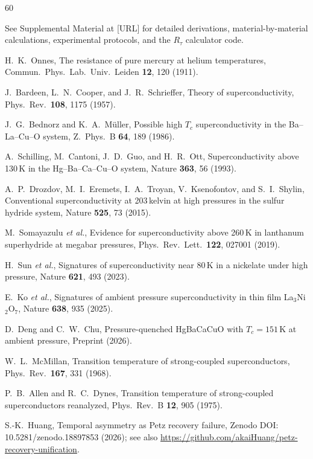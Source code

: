 \documentclass[prb,twocolumn,superscriptaddress,longbibliography,floatfix]{revtex4-2}
\newcommand{\tauasym}{\tau}
\newcommand{\Rtau}{R_{\tauasym}}
\begin{document}
\begin{thebibliography}{60}

See Supplemental Material at [URL] for detailed derivations,
material-by-material calculations, experimental protocols,
and the $\Rtau$ calculator code.

H.~K.~Onnes,
The resistance of pure mercury at helium temperatures,
Commun.\ Phys.\ Lab.\ Univ.\ Leiden \textbf{12}, 120 (1911).

J.~Bardeen, L.~N.~Cooper, and J.~R.~Schrieffer,
Theory of superconductivity,
Phys.\ Rev.\ \textbf{108}, 1175 (1957).

J.~G.~Bednorz and K.~A.~M\"uller,
Possible high $T_c$ superconductivity in the Ba--La--Cu--O system,
Z.\ Phys.\ B \textbf{64}, 189 (1986).

A.~Schilling, M.~Cantoni, J.~D.~Guo, and H.~R.~Ott,
Superconductivity above 130\,K in the Hg--Ba--Ca--Cu--O system,
Nature \textbf{363}, 56 (1993).

A.~P.~Drozdov, M.~I.~Eremets, I.~A.~Troyan, V.~Ksenofontov, and S.~I.~Shylin,
Conventional superconductivity at 203\,kelvin at high pressures in the sulfur hydride system,
Nature \textbf{525}, 73 (2015).

M.~Somayazulu \textit{et al.},
Evidence for superconductivity above 260\,K in lanthanum superhydride at megabar pressures,
Phys.\ Rev.\ Lett.\ \textbf{122}, 027001 (2019).

H.~Sun \textit{et al.},
Signatures of superconductivity near 80\,K in a nickelate under high pressure,
Nature \textbf{621}, 493 (2023).

E.~Ko \textit{et al.},
Signatures of ambient pressure superconductivity in thin film La$_3$Ni$_2$O$_7$,
Nature \textbf{638}, 935 (2025).

D.~Deng and C.~W.~Chu,
Pressure-quenched HgBaCaCuO with $T_c = 151\,$K at ambient pressure,
Preprint (2026).

W.~L.~McMillan,
Transition temperature of strong-coupled superconductors,
Phys.\ Rev.\ \textbf{167}, 331 (1968).

P.~B.~Allen and R.~C.~Dynes,
Transition temperature of strong-coupled superconductors reanalyzed,
Phys.\ Rev.\ B \textbf{12}, 905 (1975).

S.-K.~Huang,
Temporal asymmetry as Petz recovery failure,
Zenodo DOI: 10.5281/zenodo.18897853 (2026);
see also \url{https://github.com/akaiHuang/petz-recovery-unification}.


\end{thebibliography}
\end{document}
